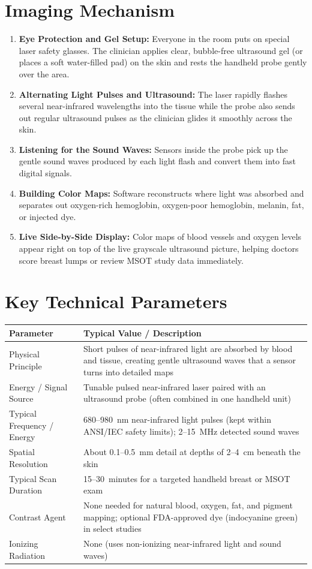 \section{Imaging Mechanism}
\begin{enumerate}
  \item \textbf{Eye Protection and Gel Setup:} Everyone in the room puts on special laser safety glasses. The clinician applies clear, bubble-free ultrasound gel (or places a soft water-filled pad) on the skin and rests the handheld probe gently over the area.
  \item \textbf{Alternating Light Pulses and Ultrasound:} The laser rapidly flashes several near-infrared wavelengths into the tissue while the probe also sends out regular ultrasound pulses as the clinician glides it smoothly across the skin.
  \item \textbf{Listening for the Sound Waves:} Sensors inside the probe pick up the gentle sound waves produced by each light flash and convert them into fast digital signals.
  \item \textbf{Building Color Maps:} Software reconstructs where light was absorbed and separates out oxygen-rich hemoglobin, oxygen-poor hemoglobin, melanin, fat, or injected dye.
  \item \textbf{Live Side-by-Side Display:} Color maps of blood vessels and oxygen levels appear right on top of the live grayscale ultrasound picture, helping doctors score breast lumps or review MSOT study data immediately.
\end{enumerate}

\section{Key Technical Parameters}
\noindent
\begin{tabularx}{\textwidth}{@{}l X@{}}
\toprule
\textbf{Parameter} & \textbf{Typical Value / Description} \\
\midrule
Physical Principle & Short pulses of near-infrared light are absorbed by blood and tissue, creating gentle ultrasound waves that a sensor turns into detailed maps \\
Energy / Signal Source & Tunable pulsed near-infrared laser paired with an ultrasound probe (often combined in one handheld unit) \\
Typical Frequency / Energy & 680--980~nm near-infrared light pulses (kept within ANSI/IEC safety limits); 2--15~MHz detected sound waves \\
Spatial Resolution & About 0.1--0.5~mm detail at depths of 2--4~cm beneath the skin \\
Typical Scan Duration & 15--30~minutes for a targeted handheld breast or MSOT exam \\
Contrast Agent & None needed for natural blood, oxygen, fat, and pigment mapping; optional FDA-approved dye (indocyanine green) in select studies \\
Ionizing Radiation & None (uses non-ionizing near-infrared light and sound waves) \\
\bottomrule
\end{tabularx}

